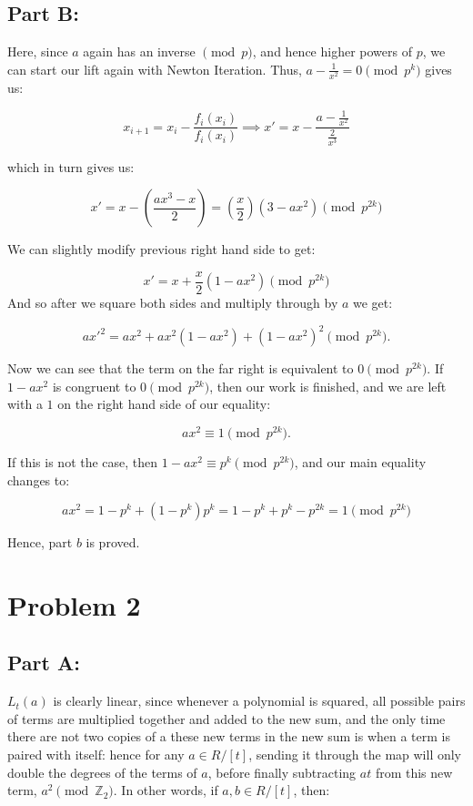 \documentclass[12pt]{article}
\theoremstyle{moo}
\def\zz{{\mathbb Z}}
\begin{document}
\subsection*{Part B:}

Here, since $a$ again has an inverse $\pmod{p}$, and hence higher powers of $p$, we can start our lift again with Newton Iteration. Thus, $a - \frac{1}{x^2} = 0 \pmod{p^k}$ gives us:

\[
x_{i+1} =  x_i - \frac{f_i(x_i)}{f_i(x_i)}  \implies x' = x - \frac{a-\frac{1}{x^2}}{\frac{2}{x^3}}
\]

which in turn gives us:


\[
x' = x - \left( \frac{ax^3 - x}{2} \right) = \left( \frac{x}{2} \right) \left( 3 - ax^2 \right) \pmod{p^{2k}}
\]

We can slightly modify previous right hand side to get:

\[
x' = x + \frac{x}{2} \left( 1 - ax^2 \right) \pmod{p^{2k}}
\]
And so after we square both sides and multiply through by $a$ we get:


\[
ax'^2 = ax^2 + ax^2 \left( 1 - ax^2 \right) + \left( 1 - ax^2 \right)^2 \pmod{p^{2k}}.
\]

Now we can see that the term on the far right is equivalent to $0 \pmod{p^{2k}}$. If  $1 - ax^2$ is congruent to $0 \pmod{p^{2k}}$, then our work is finished, and we are left with a $1$ on the right hand side of our equality:

\[
ax^2 \equiv 1 \pmod{p^{2k}}.
\]

If this is not the case, then $1 - ax^2 \equiv p^k \pmod{p^{2k}}$, and our main equality changes to:

\[
ax^2 = 1 - p^k + (1-p^k)p^k = 1 - p^k + p^ k -p^{2k} = 1 \pmod{p^{2k}} 
\]

Hence, part $b$ is proved.



\section*{Problem 2}
\subsection*{Part A:}

$L_t(a)$ is clearly linear, since whenever a polynomial is squared, all possible pairs of terms are multiplied together and added to the new sum, and the only time there are not two copies of a these new terms in the new sum is when a term is paired with itself: hence for any $ a \in R/ \left[t \right]$, sending it through the map will only double the degrees of the terms of $a$, before finally subtracting $at$ from this new term, $a^2 \pmod{\zz_2}$. In other words, if $a,b \in R/ \left[t\right]$, then:
\end{document}
